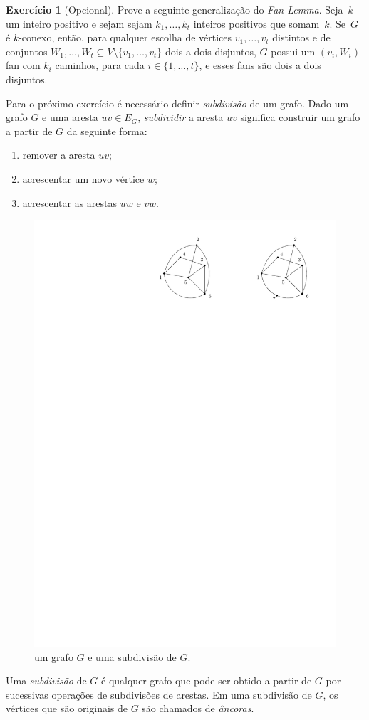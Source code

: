 \documentclass[12pt, a4paper]{article}
\theoremstyle{definition}
\newtheorem{exer}{Exercício}
\begin{document}
\begin{exer}[Opcional]
  Prove a seguinte generalização do \emph{Fan Lemma}. Seja~$k$ um inteiro positivo e sejam sejam $k_1,\dots,k_t$ inteiros positivos que somam~$k$. Se~$G$ é $k$-conexo, então, para qualquer escolha de vértices $v_1,\dots,v_t$ distintos e de conjuntos $W_1,\dots,W_t \subseteq V \setminus \{v_1,\dots,v_t\}$ dois a dois disjuntos, $G$ possui um $(v_i,W_i)$-fan com $k_i$ caminhos, para cada $i \in \{1, \dots, t\}$, e esses fans são dois a dois disjuntos.
\end{exer}

Para o próximo exercício é necessário definir \emph{subdivisão} de um grafo.
Dado um grafo $G$ e uma aresta $uv \in E_G$, \emph{subdividir} a aresta $uv$ significa construir um grafo a partir de $G$ da seguinte forma:
\begin{enumerate}
\item remover a aresta $uv$;
\item acrescentar um novo vértice $w$;
\item acrescentar as arestas $uw$ e $vw$.
\end{enumerate}
\begin{figure}[H]
  \centering
  \includegraphics{subdividir.pdf}
  \caption{um grafo $G$ e uma subdivisão de $G$.}
  \label{fig:subdiv}
\end{figure}
Uma \emph{subdivisão} de $G$ é qualquer grafo que pode ser obtido a partir de $G$ por sucessivas operações de subdivisões de arestas. Em uma subdivisão de $G$, os vértices que são originais de $G$ são chamados de \emph{âncoras}.
\end{document}
